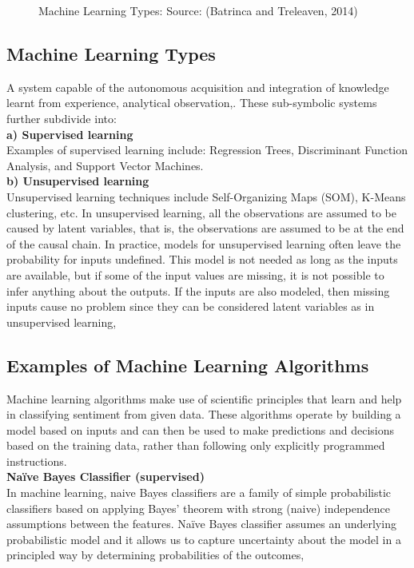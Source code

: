 \begin{figure}[h]
  \centering
  \caption[Vector graphics example]%
  {Machine Learning Types: Source: (Batrinca and Treleaven, 2014)}
  \label{fig:ALAP:sm3}
\end{figure}


\clearpage
\subsection{Machine Learning Types}
A system capable of the autonomous acquisition and integration of knowledge learnt from
experience, analytical observation,\cite{ref44}. These sub-symbolic systems further
subdivide into:
\leavevmode\\
\textbf{a) Supervised learning}
\leavevmode\\
Examples of supervised learning include: Regression Trees, Discriminant Function Analysis, and
Support Vector Machines.
\leavevmode\\
\textbf{b) Unsupervised learning}
\leavevmode\\
Unsupervised learning techniques include Self-Organizing Maps (SOM), K-Means clustering, etc.
In unsupervised learning, all the observations are assumed to be caused by latent variables, that is,
the observations are assumed to be at the end of the causal chain. In practice, models for
unsupervised learning often leave the probability for inputs undefined. This model is not needed
as long as the inputs are available, but if some of the input values are missing, it is not possible to
infer anything about the outputs. If the inputs are also modeled, then missing inputs cause no
problem since they can be considered latent variables as in unsupervised learning, \cite{ref28}
\leavevmode\\

\subsection{Examples of Machine Learning Algorithms}

Machine learning algorithms make use of scientific principles that learn and help in classifying
sentiment from given data. These algorithms operate by building a model based on inputs and can
then be used to make predictions and decisions based on the training data, rather than following
only explicitly programmed instructions.\\
\textbf{Naïve Bayes Classifier (supervised)}\\
In machine learning, naive Bayes classifiers are a family of simple probabilistic classifiers based
on applying Bayes' theorem with strong (naive) independence assumptions between the features.
Naïve Bayes classifier assumes an underlying probabilistic model and it allows us to capture
uncertainty about the model in a principled way by determining probabilities of the outcomes,
\cite{ref29}


